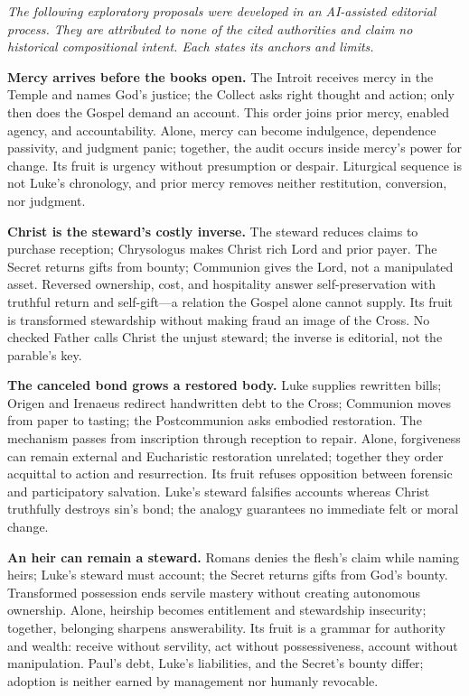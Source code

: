 \begin{deepstudy}
\noindent\emph{The following exploratory proposals were developed in an AI-assisted editorial process. They are attributed to none of the cited authorities and claim no historical compositional intent. Each states its anchors and limits.}

\noindent\textbf{Mercy arrives before the books open.\enspace{}}
The Introit receives mercy in the Temple and names God's justice; the Collect asks right thought and action; only then does the Gospel demand an account. This order joins prior mercy, enabled agency, and accountability. Alone, mercy can become indulgence, dependence passivity, and judgment panic; together, the audit occurs inside mercy's power for change. Its fruit is urgency without presumption or despair. Liturgical sequence is not Luke's chronology, and prior mercy removes neither restitution, conversion, nor judgment.

\noindent\textbf{Christ is the steward's costly inverse.\enspace{}}
The steward reduces claims to purchase reception; Chrysologus makes Christ rich Lord and prior payer. The Secret returns gifts from bounty; Communion gives the Lord, not a manipulated asset. Reversed ownership, cost, and hospitality answer self-preservation with truthful return and self-gift---a relation the Gospel alone cannot supply. Its fruit is transformed stewardship without making fraud an image of the Cross. No checked Father calls Christ the unjust steward; the inverse is editorial, not the parable's key.

\noindent\textbf{The canceled bond grows a restored body.\enspace{}}
Luke supplies rewritten bills; Origen and Irenaeus redirect handwritten debt to the Cross; Communion moves from paper to tasting; the Postcommunion asks embodied restoration. The mechanism passes from inscription through reception to repair. Alone, forgiveness can remain external and Eucharistic restoration unrelated; together they order acquittal to action and resurrection. Its fruit refuses opposition between forensic and participatory salvation. Luke's steward falsifies accounts whereas Christ truthfully destroys sin's bond; the analogy guarantees no immediate felt or moral change.

\noindent\textbf{An heir can remain a steward.\enspace{}}
Romans denies the flesh's claim while naming heirs; Luke's steward must account; the Secret returns gifts from God's bounty. Transformed possession ends servile mastery without creating autonomous ownership. Alone, heirship becomes entitlement and stewardship insecurity; together, belonging sharpens answerability. Its fruit is a grammar for authority and wealth: receive without servility, act without possessiveness, account without manipulation. Paul's debt, Luke's liabilities, and the Secret's bounty differ; adoption is neither earned by management nor humanly revocable.


\end{deepstudy}

